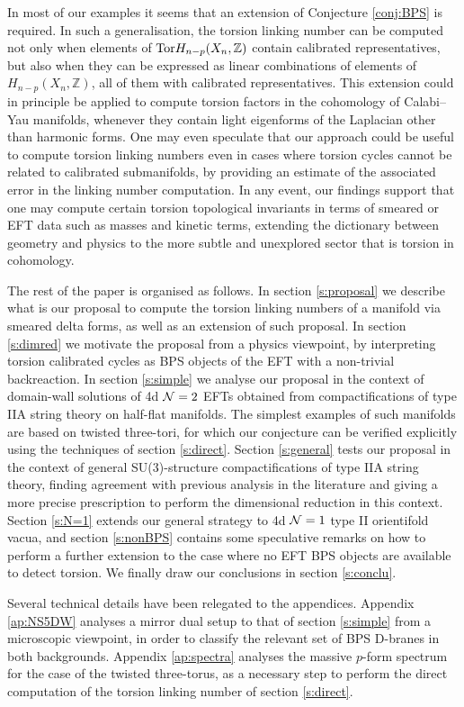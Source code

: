 \documentclass[11pt]{article}
\def\CN {{\cal N}}
\newcommand{\IZ}{\mathbb{Z}}
\begin{document}
In most of our examples it seems that an extension of Conjecture \ref{conj:BPS} is required. In such a generalisation, the torsion linking number can be computed not only when elements of ${\rm Tor}H_{n-p}(X_n, \IZ)$ contain calibrated representatives, but also when they can be expressed as linear combinations of elements of $H_{n-p}(X_n, \IZ)$, all of them with calibrated representatives. This extension could in principle be applied to compute torsion factors in the cohomology of Calabi--Yau manifolds, whenever they contain light eigenforms of the Laplacian other than harmonic forms. One may even speculate that our approach could be useful to compute torsion linking numbers even in cases where torsion cycles cannot be related to calibrated submanifolds, by providing an estimate of the associated error in the linking number computation. In any event, our findings support that one may compute certain torsion topological invariants in terms of smeared or EFT data such as masses and kinetic terms, extending the dictionary between geometry and physics to the more subtle and unexplored sector that is torsion in cohomology. 

The rest of the paper is organised as follows. In section \ref{s:proposal} we describe what is our proposal to compute the torsion linking numbers of a manifold via smeared delta forms, as well as an extension of such proposal. In section \ref{s:dimred} we motivate the proposal from a physics viewpoint, by interpreting torsion calibrated cycles as BPS objects of the EFT with a non-trivial backreaction. In section \ref{s:simple} we analyse our proposal in the context of domain-wall solutions of 4d $\CN=2$ EFTs obtained from compactifications of type IIA string theory on half-flat manifolds. The simplest examples of such manifolds are based on twisted three-tori, for which our conjecture can be verified explicitly using the techniques of section \ref{s:direct}. Section \ref{s:general} tests our proposal in the context of general SU(3)-structure compactifications of type IIA string theory, finding agreement with previous analysis in the literature and giving a more precise prescription to perform the dimensional reduction in this context. Section \ref{s:N=1} extends our general strategy to 4d $\CN=1$  type II orientifold vacua, and section \ref{s:nonBPS} contains some speculative remarks on how to perform a further extension to the case where no EFT BPS objects are available to detect torsion. We finally draw our conclusions in section \ref{s:conclu}. 

Several technical details have been relegated to the appendices. Appendix \ref{ap:NS5DW} analyses a mirror dual setup to that of section \ref{s:simple} from a microscopic viewpoint, in order to classify the relevant set of BPS D-branes in both backgrounds. Appendix \ref{ap:spectra} analyses the massive $p$-form spectrum for the case of the twisted three-torus, as a necessary step to perform the direct computation of the torsion linking number of section \ref{s:direct}.
\end{document}
